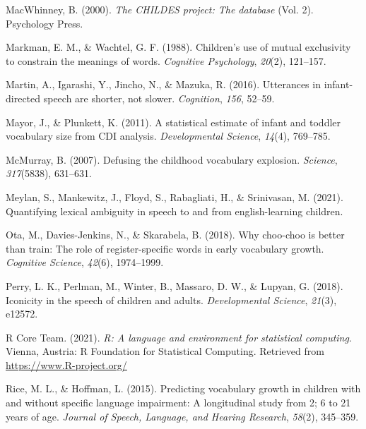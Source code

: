 \documentclass[10pt, letterpaper]{article}
\newenvironment{CSLReferences}%
  {}%
  {\par}
\begin{document}
\begin{CSLReferences}{1}{0}
\leavevmode\hypertarget{ref-macwhinney2000childes}{}%
MacWhinney, B. (2000). \emph{The CHILDES project: The database} (Vol.
2). Psychology Press.

\leavevmode\hypertarget{ref-markman1988children}{}%
Markman, E. M., \& Wachtel, G. F. (1988). Children's use of mutual
exclusivity to constrain the meanings of words. \emph{Cognitive
Psychology}, \emph{20}(2), 121--157.

\leavevmode\hypertarget{ref-martin2016utterances}{}%
Martin, A., Igarashi, Y., Jincho, N., \& Mazuka, R. (2016). Utterances
in infant-directed speech are shorter, not slower. \emph{Cognition},
\emph{156}, 52--59.

\leavevmode\hypertarget{ref-mayor2011statistical}{}%
Mayor, J., \& Plunkett, K. (2011). A statistical estimate of infant and
toddler vocabulary size from CDI analysis. \emph{Developmental Science},
\emph{14}(4), 769--785.

\leavevmode\hypertarget{ref-mcmurray2007defusing}{}%
McMurray, B. (2007). Defusing the childhood vocabulary explosion.
\emph{Science}, \emph{317}(5838), 631--631.

\leavevmode\hypertarget{ref-meylan2021quantifying}{}%
Meylan, S., Mankewitz, J., Floyd, S., Rabagliati, H., \& Srinivasan, M.
(2021). Quantifying lexical ambiguity in speech to and from
english-learning children.

\leavevmode\hypertarget{ref-ota2018choo}{}%
Ota, M., Davies-Jenkins, N., \& Skarabela, B. (2018). Why choo-choo is
better than train: The role of register-specific words in early
vocabulary growth. \emph{Cognitive Science}, \emph{42}(6), 1974--1999.

\leavevmode\hypertarget{ref-perry2018iconicity}{}%
Perry, L. K., Perlman, M., Winter, B., Massaro, D. W., \& Lupyan, G.
(2018). Iconicity in the speech of children and adults.
\emph{Developmental Science}, \emph{21}(3), e12572.

\leavevmode\hypertarget{ref-r2021}{}%
R Core Team. (2021). \emph{R: A language and environment for statistical
computing}. Vienna, Austria: R Foundation for Statistical Computing.
Retrieved from \url{https://www.R-project.org/}

\leavevmode\hypertarget{ref-rice2015predicting}{}%
Rice, M. L., \& Hoffman, L. (2015). Predicting vocabulary growth in
children with and without specific language impairment: A longitudinal
study from 2; 6 to 21 years of age. \emph{Journal of Speech, Language,
and Hearing Research}, \emph{58}(2), 345--359.


\end{CSLReferences}
\end{document}
